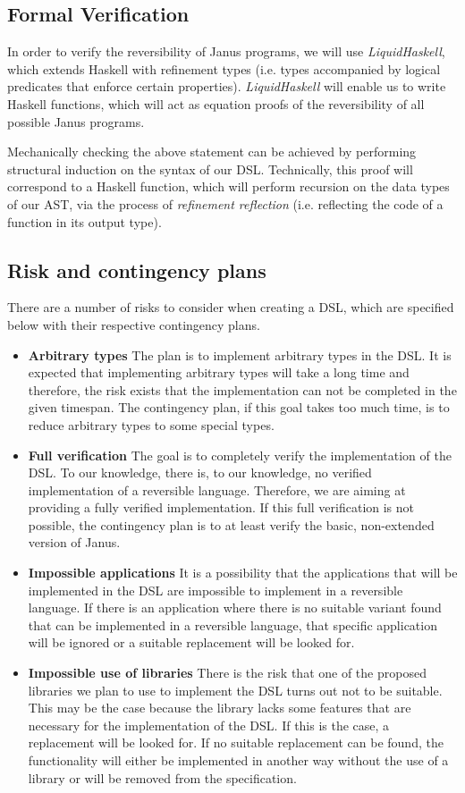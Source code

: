 \documentclass[12pt,a4paper]{article}
\begin{document}
\subsection{Formal Verification}
In order to verify the reversibility of Janus programs, we will use \textit{LiquidHaskell}, which extends Haskell with refinement types (i.e. types accompanied by logical predicates that enforce certain properties). \textit{LiquidHaskell} will enable us to write Haskell functions, which will act as equation proofs of the reversibility of all possible Janus programs.

Mechanically checking the above statement can be achieved by performing structural induction on the syntax of our DSL. Technically, this proof will correspond to a Haskell function, which will perform recursion on the data types of our AST, via the process of \textit{refinement reflection} (i.e. reflecting the code of a function in its output type).

\subsection{Risk and contingency plans}
There are a number of risks to consider when creating a DSL, which are specified below with their respective contingency plans.
\begin{itemize}
\item \textbf{Arbitrary types} The plan is to implement arbitrary types in the DSL. It is expected that implementing arbitrary types will take a long time and therefore, the risk exists that the implementation can not be completed in the given timespan. The contingency plan, if this goal takes too much time, is to reduce arbitrary types to some special types.
\item \textbf{Full verification} The goal is to completely verify the implementation of the DSL. To our knowledge, there is, to our knowledge, no verified implementation of a reversible language. Therefore, we are aiming at providing a fully verified implementation. If this full verification is not possible, the contingency plan is to at least verify the basic, non-extended version of Janus. 
\item \textbf{Impossible applications} It is a possibility that the applications that will be implemented in the DSL are impossible to implement in a reversible language. If there is an application where there is no suitable variant found that can be implemented in a reversible language, that specific application will be ignored or a suitable replacement will be looked for. 
\item \textbf{Impossible use of libraries} There is the risk that one of the proposed libraries we plan to use to implement the DSL turns out not to be suitable. This may be the case because the library lacks some features that are necessary for the implementation of the DSL. If this is the case, a replacement will be looked for. If no suitable replacement can be found, the functionality will either be implemented in another way without the use of a library or will be removed from the specification.
\end{itemize} 
\end{document}
